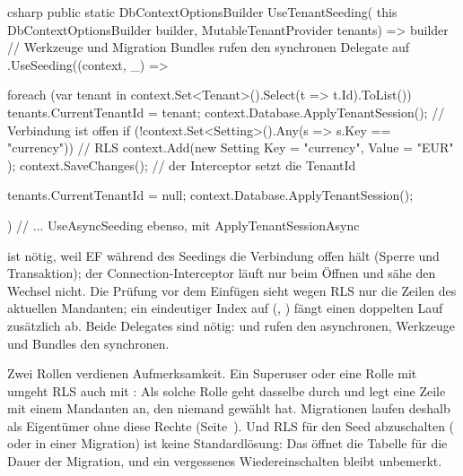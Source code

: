 \begin{sourcecode}{csharp}
public static DbContextOptionsBuilder UseTenantSeeding(
    this DbContextOptionsBuilder builder, MutableTenantProvider tenants)
    => builder
        // Werkzeuge und Migration Bundles rufen den synchronen Delegate auf
        .UseSeeding((context, _) =>
        {
            foreach (var tenant in context.Set<Tenant>().Select(t => t.Id).ToList())
            {
                tenants.CurrentTenantId = tenant;
                context.Database.ApplyTenantSession();   // Verbindung ist offen
                if (!context.Set<Setting>().Any(s => s.Key == "currency"))   // RLS
                {
                    context.Add(new Setting { Key = "currency", Value = "EUR" });
                    context.SaveChanges();      // der Interceptor setzt die TenantId
                }
            }

            tenants.CurrentTenantId = null;
            context.Database.ApplyTenantSession();
        })
        // ... UseAsyncSeeding ebenso, mit ApplyTenantSessionAsync
\end{sourcecode}

 ist nötig, weil EF während des Seedings die
Verbindung offen hält (Sperre und Transaktion); der Connection-Interceptor läuft nur beim
Öffnen und sähe den Wechsel nicht. Die Prüfung vor dem Einfügen sieht wegen RLS nur die Zeilen
des aktuellen Mandanten; ein eindeutiger Index auf (,
) fängt einen doppelten Lauf zusätzlich ab. Beide Delegates sind nötig:
 und  rufen
den asynchronen, Werkzeuge und Bundles den synchronen.

Zwei Rollen verdienen Aufmerksamkeit. Ein Superuser oder eine Rolle mit 
umgeht RLS auch mit : Als solche Rolle geht dasselbe 
durch und legt eine Zeile mit einem Mandanten an, den niemand gewählt hat. Migrationen laufen
deshalb als Eigentümer ohne diese Rechte (Seite~\pageref{sec:deployment}). Und RLS für den
Seed abzuschalten ( oder  in einer Migration) ist keine
Standardlösung: Das öffnet die Tabelle für die Dauer der Migration, und ein vergessenes
Wiedereinschalten bleibt unbemerkt.

